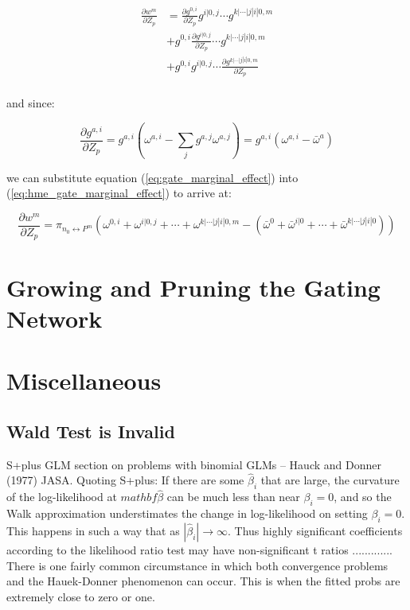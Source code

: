 \documentclass[12pt]{article}
\newcommand{\mean}[1]{\bar{#1}}
\begin{document}
\begin{equation} \label{eq:hme_gate_marginal_effect}
  \begin{split}
    \frac{\partial w^{m}}{\partial Z_{p}} &= \frac{\partial g^{0, i}}{\partial Z_{p}} g^{i|0, j} \cdots g^{k|\cdots|j|i|0, m} \\
    &+ g^{0, i} \frac{\partial g^{i|0, j}}{\partial Z_{p}} \cdots g^{k|\cdots|j|i|0, m} \\
    &+ g^{0, i} g^{i|0, j} \cdots \frac{\partial g^{k|\cdots|j|i|0, m}}{\partial Z_{p}} \\
  \end{split}
\end{equation}

and since:

\begin{equation} \label{eq:gate_marginal_effect}
  \frac{\partial g^{a, i}}{\partial Z_{p}} = g^{a, i}(\omega^{a, i} - \sum_{j} g^{a, j} \omega^{a, j}) = g^{a, i}(\omega^{a, i} - \mean{\omega}^{a})
\end{equation}

we can substitute equation (\ref{eq:gate_marginal_effect}) into
(\ref{eq:hme_gate_marginal_effect}) to arrive at:

\begin{equation}
  \frac{\partial w^{m}}{\partial Z_{p}} = \pi_{n_{0} {\longleftrightarrow} P^{m}} (\omega^{0, i} + \omega^{i|0, j} + \cdots + \omega^{k|\cdots|j|i|0, m} - (\mean{\omega}^{0} + \mean{\omega}^{i|0} + \cdots + \mean{\omega}^{k|\cdots|j|i|0}))
\end{equation}




\section{Growing and Pruning the Gating Network} \label{sec:NetworkGrowth}



\section{Miscellaneous}

\subsection{Wald Test is Invalid}
S+plus GLM section on problems with binomial GLMs
  -- Hauck and Donner (1977) JASA. Quoting S+plus: If there are
  some $\hat{\beta}_{i}$ that are large, the curvature of the log-likelihood at
  $mathbf{\hat{\beta}}$ can be much less than near $\beta_{i}=0$, and so the Walk
  approximation understimates the change in log-likelihood on setting $\beta_{i}=0$.
  This happens in such a way that as $|\hat{\beta}_{i}| \rightarrow \infty$. Thus
  highly significant coefficients according to the likelihood ratio test may have
  non-significant t ratios ............. There is one fairly common circumstance
  in which both convergence problems and the Hauek-Donner phenomenon can occur.
  This is when the fitted probs are extremely close to zero or one.
\end{document}
